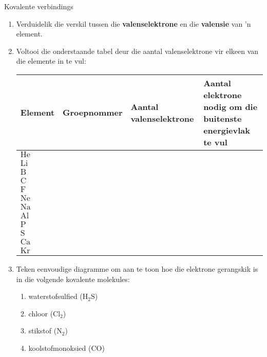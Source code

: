 \begin{exercises}{Kovalente verbindings}
{
            \nopagebreak
        \label{m38704*id139588}\begin{enumerate}[noitemsep, label=\textbf{\arabic*}. ] 
            \label{m38704*uid10}\item Verduidelik die verskil tussen die \textbf{valenselektrone} en die \textbf{valensie} van 'n  element.
\label{m38704*uid11}\item Voltooi die onderstaande tabel deur die aantal valenselektrone vir elkeen van die elemente in te vul:
          \begin{table}[H]
        \begin{center}
      \label{m38704*id139625}
    \noindent
      \begin{tabular}{|l|l|p{3cm}|p{3cm}|}\hline
\textbf{Element} & \textbf{Groepnommer} & \textbf{Aantal valenselektrone} & \textbf{Aantal elektrone nodig om die buitenste energievlak te vul}  \\ \hline
        $\text{He}$ & & & \\ \hline
        $\text{Li}$ & & & \\ \hline
        $\text{B}$ & & & \\ \hline
        $\text{C}$ & & & \\ \hline
        $\text{F}$ & & & \\ \hline
        $\text{Ne}$ & & & \\ \hline
        $\text{Na}$ & & & \\ \hline
        $\text{Al}$ & & & \\ \hline
        $\text{P}$ & & & \\ \hline
        $\text{S}$ & & & \\ \hline
        $\text{Ca}$ & & & \\ \hline
        $\text{Kr}$ & & & \\ \hline
    \end{tabular}
      \end{center}
\end{table}
          \label{m38704*uid12}\item Teken eenvoudige diagramme om aan te toon hoe die elektrone gerangskik is in die volgende kovalente molekules:
\label{m38704*id140030}\begin{enumerate}[noitemsep, label=\textbf{\alph*}. ] 
            \label{m38704*uid13}\item waterstofsulfied ($\text{H}_{2}\text{S}$)
\label{m38704*uid14}\item chloor ($\text{Cl}_{2}$)
\item stikstof ($\text{N}_2$)
\item koolstofmonoksied ($\text{CO}$)
\end{enumerate}
                \end{enumerate}

}
\end{exercises}
